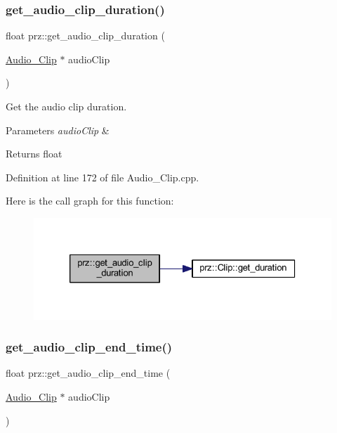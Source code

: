 \subsubsection{\texorpdfstring{get\_audio\_clip\_duration()}{get\_audio\_clip\_duration()}}
{\footnotesize\ttfamily float prz\+::get\+\_\+audio\+\_\+clip\+\_\+duration (\begin{DoxyParamCaption}\item[{\mbox{\hyperlink{classprz_1_1_audio___clip}{Audio\+\_\+\+Clip}} $\ast$}]{audio\+Clip }\end{DoxyParamCaption})}



Get the audio clip duration. 


\begin{DoxyParams}{Parameters}
{\em audio\+Clip} & \\
\hline
\end{DoxyParams}
\begin{DoxyReturn}{Returns}
float 
\end{DoxyReturn}


Definition at line 172 of file Audio\+\_\+\+Clip.\+cpp.

Here is the call graph for this function\+:
\nopagebreak
\begin{figure}[H]
\begin{center}
\leavevmode
\includegraphics[width=326pt]{namespaceprz_adf1775cc377a8c1a6b92ba0e648d98f1_cgraph}
\end{center}
\end{figure}
\mbox{\label{namespaceprz_ab424e7684c53c76bd12b24e549df8d32}} 
\subsubsection{\texorpdfstring{get\_audio\_clip\_end\_time()}{get\_audio\_clip\_end\_time()}}
{\footnotesize\ttfamily float prz\+::get\+\_\+audio\+\_\+clip\+\_\+end\+\_\+time (\begin{DoxyParamCaption}\item[{\mbox{\hyperlink{classprz_1_1_audio___clip}{Audio\+\_\+\+Clip}} $\ast$}]{audio\+Clip }\end{DoxyParamCaption})}



